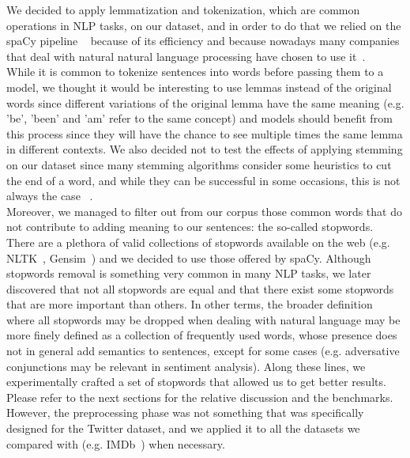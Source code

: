 We decided to apply lemmatization and tokenization, which are common operations in NLP tasks, on our dataset, and in order to do that we relied on the spaCy pipeline ~\cite{startups:spaCy} because of its efficiency and because nowadays many companies that deal with natural natural language processing have chosen to use it~\cite{data:companies_using_spacy}.\\

While it is common to tokenize sentences into words before passing them to a model, we thought it would be interesting to use lemmas instead of the original words since different variations of the original lemma have the same meaning (e.g. 'be', 'been' and 'am' refer to the same concept) and models should benefit from this process since they will have the chance to see multiple times the same lemma in different contexts. We also decided not to test the effects of applying stemming on our dataset since many stemming algorithms consider some heuristics to cut the end of a word, and while they can be successful in some occasions, this is not always the case ~\cite{data:standfordNLP}.\\

Moreover, we managed to filter out from our corpus those common words that do not contribute to adding meaning to our sentences: the so-called stopwords. There are a plethora of valid collections of stopwords available on the web (e.g. NLTK~\cite{startups:nltk}, Gensim~\cite{startups:gensim}) and we decided to use those offered by spaCy. Although stopwords removal is something very common in many NLP tasks, we later discovered that not all stopwords are equal and that there exist some stopwords that are more important than others. In other terms, the broader definition where all stopwords may be dropped when dealing with natural language may be more finely defined as a collection of frequently used words, whose presence does not in general add semantics to sentences, except for some cases (e.g. adversative conjunctions may be relevant in sentiment analysis).
Along these lines, we experimentally crafted a set of stopwords that allowed us to get better results. Please refer to the next sections for the relative discussion and the benchmarks.\\

However, the preprocessing phase was not something that was specifically designed for the Twitter dataset, and we applied it to all the datasets we compared with (e.g. IMDb~\cite{data:imdb}) when necessary.